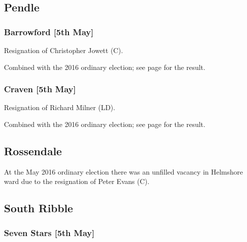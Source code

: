 \documentclass[a4paper,openany]{book}
\begin{document}
\begin{resultsiii}
\subsection*{Pendle}

\subsubsection*{Barrowford \hspace*{\fill}\nolinebreak[1]%
\enspace\hspace*{\fill}
[5th May]}


Resignation of Christopher Jowett (C).

Combined with the 2016 ordinary election; see page \pageref{BarrowfordPendle} for the result.

\subsubsection*{Craven \hspace*{\fill}\nolinebreak[1]%
\enspace\hspace*{\fill}
[5th May]}


Resignation of Richard Milner (LD).

Combined with the 2016 ordinary election; see page \pageref{CravenPendle} for the result.

\subsection*{Rossendale}

At the May 2016 ordinary election there was an unfilled vacancy in Helmshore ward due to the resignation of Peter Evans (C).

\subsection*{South Ribble}

\subsubsection*{Seven Stars \hspace*{\fill}\nolinebreak[1]%
\enspace\hspace*{\fill}
[5th May]}


\end{resultsiii}
\end{document}
